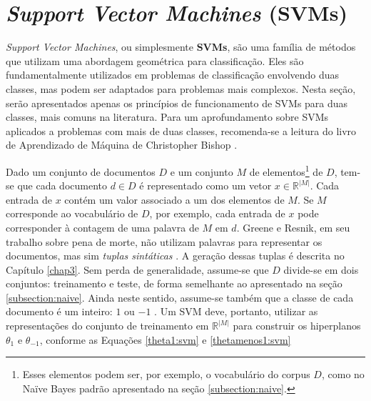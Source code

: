  

\section{\emph{Support Vector Machines} (SVMs)}
\label{subsection:SVMs}

\emph{Support Vector Machines}, ou simplesmente \textbf{SVMs}, são uma família de métodos que utilizam uma abordagem geométrica para classificação. Eles são fundamentalmente utilizados em problemas de classificação envolvendo duas classes, mas podem ser adaptados para problemas mais complexos. Nesta seção, serão apresentados apenas os princípios de funcionamento de SVMs para duas classes, mais comuns na literatura. Para um aprofundamento sobre SVMs aplicados a problemas com mais de duas classes, recomenda-se a leitura do livro de Aprendizado de Máquina de Christopher Bishop \cite{bishop}.

Dado um conjunto de documentos \ensuremath{D} e um conjunto \ensuremath{M} de elementos\footnote{Esses elementos podem ser, por exemplo, o vocabulário do corpus \ensuremath{D}, como no Naïve Bayes padrão apresentado na seção \ref{subsection:naive}.} de \ensuremath{D}, tem-se que cada documento \ensuremath{d \in D} é representado como um vetor \ensuremath{x \in \mathbb{R}^{|M|}}. Cada entrada de \ensuremath{x} contém um valor associado a um dos elementos de \ensuremath{M}. Se \ensuremath{M} corresponde ao vocabulário de \ensuremath{D}, por exemplo, cada entrada de \ensuremath{x} pode corresponder à contagem de uma palavra de \ensuremath{M} em \ensuremath{d}. Greene e Resnik, em seu trabalho sobre pena de morte, não utilizam palavras para representar os documentos, mas sim \emph{tuplas sintáticas} \cite{greene}. A geração dessas tuplas é descrita no Capítulo \ref{chap3}. Sem perda de generalidade, assume-se que \ensuremath{D} divide-se em dois conjuntos: treinamento e teste, de forma semelhante ao apresentado na seção \ref{subsection:naive}. Ainda neste sentido, assume-se também que a classe de cada documento é um inteiro: \ensuremath{1} ou \ensuremath{-1} \cite{mono-puc}. Um SVM deve, portanto, utilizar as representações do conjunto de treinamento em \ensuremath{\mathbb{R}^{|M|}} para construir os hiperplanos \ensuremath{\theta_1} e \ensuremath{\theta_{-1}}, conforme as Equações \ref{theta1:svm} e \ref{thetamenos1:svm} \cite{mono-puc}

